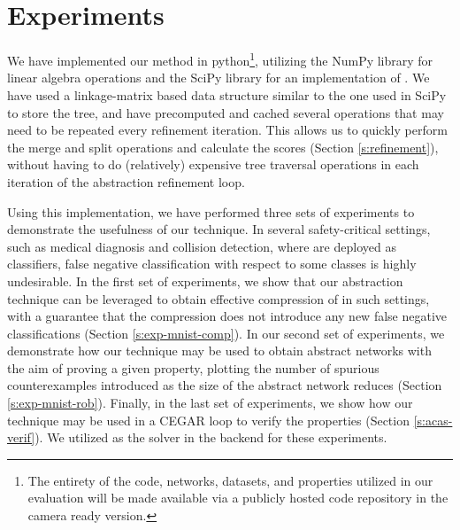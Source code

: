 \section{Experiments} 


We have implemented our method in python\footnote{The entirety of the code,
    networks, datasets, and properties utilized in our evaluation will be made
    available via a publicly hosted code repository in the
camera ready version.}, utilizing the NumPy library for linear algebra
operations and the SciPy library for an implementation of \hcluster.
We have used a linkage-matrix based data structure similar to the one used in
SciPy to store the tree, and have precomputed and cached several
operations that may need to be repeated every refinement iteration. This allows
us to quickly perform the merge and split operations and calculate the
scores (Section \ref{s:refinement}), without having to do (relatively)
expensive tree traversal operations in each iteration of the abstraction
refinement loop. 

Using this implementation, we have performed three sets of experiments to
demonstrate the usefulness of our technique. In several safety-critical
settings, such as medical diagnosis and collision detection, where \dnn are
deployed as classifiers, false negative classification with respect to some
classes is highly undesirable. In the first set of experiments, we show that
our abstraction technique can be leveraged to obtain effective compression of
\dnn in such settings, with a guarantee that the compression does not introduce
any new false negative classifications (Section \ref{s:exp-mnist-comp}). In our
second set of experiments, we demonstrate how our technique may be used to
obtain abstract networks with the aim of proving a given property, plotting the
number of spurious counterexamples introduced as the size of the abstract
network reduces (Section \ref{s:exp-mnist-rob}). Finally, in the last set of
experiments, we show how our technique may be used in a CEGAR loop
\cite{cegar-nn} to verify the \acasxu properties (Section \ref{s:acas-verif}).
We utilized \abcrown as the solver in the backend for these experiments. 

